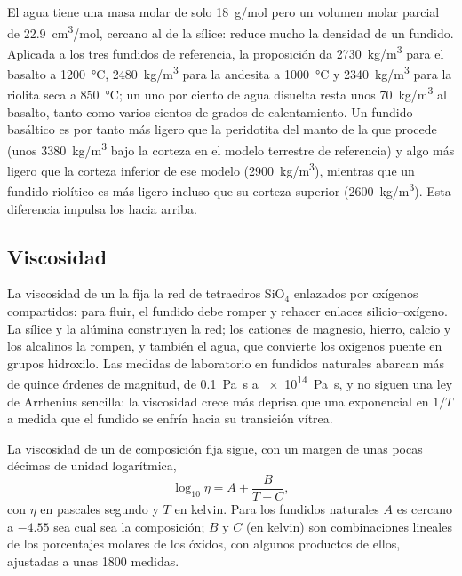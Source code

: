El agua tiene una masa molar de solo \qty{18}{g/mol} pero un volumen molar parcial de
\qty{22.9}{cm^3/mol}, cercano al de la sílice: reduce mucho la densidad de un
fundido. Aplicada a los tres fundidos de referencia, la proposición da
\qty{2730}{kg/m^3} para el basalto a \qty{1200}{\celsius}, \qty{2480}{kg/m^3} para
la andesita a \qty{1000}{\celsius} y \qty{2340}{kg/m^3} para la riolita seca
a \qty{850}{\celsius}; un uno por ciento de agua disuelta resta unos
\qty{70}{kg/m^3} al basalto, tanto como varios cientos de grados de calentamiento.
Un fundido basáltico es por tanto más ligero que la peridotita del manto de la que procede
(unos \qty{3380}{kg/m^3} bajo la corteza en el modelo terrestre de referencia) y algo
más ligero que la corteza inferior de ese modelo (\qty{2900}{kg/m^3}), mientras que un
fundido riolítico es más ligero incluso que su corteza superior (\qty{2600}{kg/m^3}). Esta diferencia impulsa los 
hacia arriba.

\subsection{Viscosidad}

La viscosidad de un  la fija la red de tetraedros SiO$_4$
enlazados por oxígenos compartidos: para fluir, el fundido debe romper y rehacer
enlaces silicio--oxígeno. La sílice y la alúmina construyen la red; los cationes de
magnesio, hierro, calcio y los alcalinos la rompen, y también el agua, que
convierte los oxígenos puente en grupos hidroxilo. Las medidas de laboratorio en fundidos
naturales abarcan más de quince órdenes de magnitud, de \qty{0.1}{Pa.s} a
\qty{e14}{Pa.s}, y no siguen una ley de Arrhenius sencilla: la viscosidad
crece más deprisa que una exponencial en $1/T$ a medida que el fundido se enfría hacia su
transición vítrea.

\begin{proposition}\label{prop:b2:magma-emplacement:vft}
La viscosidad de un  de composición fija sigue, con un margen de unas pocas
décimas de unidad logarítmica,
\[
\log_{10}\eta = A + \frac{B}{T - C},
\]
con $\eta$ en pascales segundo y $T$ en kelvin. Para los fundidos naturales $A$ es cercano
a $-4.55$ sea cual sea la composición; $B$ y $C$ (en kelvin) son combinaciones
lineales de los porcentajes molares de los óxidos, con algunos productos de ellos,
ajustadas a unas \num{1800} medidas.
\end{proposition}
\admitted

